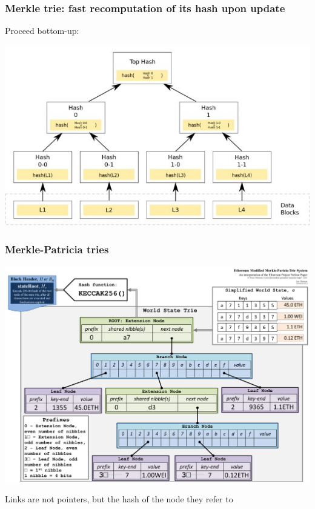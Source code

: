 \documentclass[11pt]{beamer}  %
\begin{document}
\begin{frame}\frametitle{Merkle trie: fast recomputation of its hash upon update}

  Proceed bottom-up:
  \begin{center}
    \includegraphics[scale=0.7,clip=false]{pictures/trie-hash.jpg}
  \end{center}

\end{frame}

\begin{frame}\frametitle{Merkle-Patricia tries}

  \begin{center}
    \includegraphics[scale=0.11,clip=false]{pictures/merkle-patricia.png}
  \end{center}

  Links are not pointers, but the hash of the node they refer to
\end{frame}
\end{document}
